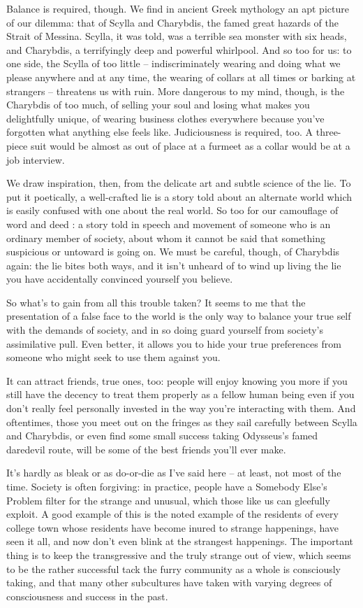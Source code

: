 Balance is required, though. We find in ancient Greek mythology an apt picture of our dilemma: that of Scylla and Charybdis, the famed great hazards of the Strait of Messina. Scylla, it was told, was a terrible sea monster with six heads, and Charybdis, a terrifyingly deep and powerful whirlpool. And so too for us: to one side, the Scylla of too little -- indiscriminately wearing and doing what we please anywhere and at any time, the wearing of collars at all times or barking at strangers -- threatens us with ruin. More dangerous to my mind, though, is the Charybdis of too much, of selling your soul and losing what makes you delightfully unique, of wearing business clothes everywhere because you've forgotten what anything else feels like. Judiciousness is required, too. A three-piece suit would be almost as out of place at a furmeet as a collar would be at a job interview.

We draw inspiration, then, from the delicate art and subtle science of the lie. To put it poetically, a well-crafted lie is a story told about an alternate world which is easily confused with one about the real world. So too for our camouflage of word and deed : a story told in speech and movement of someone who is an ordinary member of society, about whom it cannot be said that something suspicious or untoward is going on. We must be careful, though, of Charybdis again: the lie bites both ways, and it isn't unheard of to wind up living the lie you have accidentally convinced yourself you believe.

So what's to gain from all this trouble taken? It seems to me that the presentation of a false face to the world is the only way to balance your true self with the demands of society, and in so doing guard yourself from society's assimilative pull. Even better, it allows you to hide your true preferences from someone who might seek to use them against you.

It can attract friends, true ones, too: people will enjoy knowing you more if you still have the decency to treat them properly as a fellow human being even if you don't really feel personally invested in the way you're interacting with them. And oftentimes, those you meet out on the fringes as they sail carefully between Scylla and Charybdis, or even find some small success taking Odysseus's famed daredevil route, will be some of the best friends you'll ever make.

It's hardly as bleak or as do-or-die as I've said here -- at least, not most of the time. Society is often forgiving: in practice, people have a Somebody Else's Problem filter for the strange and unusual, which those like us can gleefully exploit. A good example of this is the noted example of the residents of every college town whose residents have become inured to strange happenings, have seen it all, and now don't even blink at the strangest happenings. The important thing is to keep the transgressive and the truly strange out of view, which seems to be the rather successful tack the furry community as a whole is consciously taking, and that many other subcultures have taken with varying degrees of consciousness and success in the past.

